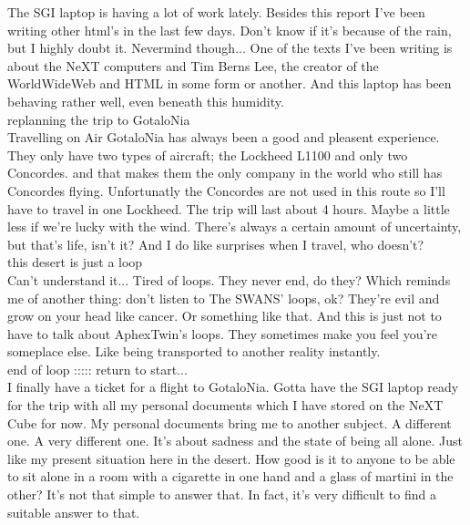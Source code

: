 \documentclass[11pt,twoside,a4paper]{book}
\begin{document}
\begin{multicols*}{2}
The SGI laptop is having a lot of work lately. Besides this report I've been writing other html's in the last few days. Don't know if it's because of the rain, but I highly doubt it. Nevermind though... One of the texts I've been writing is about the NeXT computers and Tim Berns Lee, the creator of the WorldWideWeb and HTML in some form or another. And this laptop has been behaving rather well, even beneath this humidity. ~\\ 

replanning the trip to GotaloNia ~\\

Travelling on Air GotaloNia has always been a good and pleasent experience. They only have two types of aircraft; the Lockheed L1100 and only two Concordes. and that makes them the only company in the world who still has Concordes flying. Unfortunatly the Concordes are not used in this route so I'll have to travel in one Lockheed. The trip will last about 4 hours. Maybe a little less if we're lucky with the wind. There's always a certain amount of uncertainty, but that's life, isn't it? And I do like surprises when I travel, who doesn't? ~\\

{\large this desert is just a loop} ~\\

Can't understand it... Tired of loops. They never end, do they? Which reminds me of another thing: don't listen to The SWANS' loops, ok? They're evil and grow on your head like cancer. Or something like that. And this is just not to have to talk about AphexTwin's loops. They sometimes make you feel you're someplace else. Like being transported to another reality instantly. ~\\

end of loop ::::: return to start... ~\\

I finally have a ticket for a flight to GotaloNia. Gotta have the SGI laptop ready for the trip with all my personal documents which I have stored on the NeXT Cube for now. My personal documents bring me to another subject. A different one. A very different one. It's about sadness and the state of being all alone. Just like my present situation here in the desert. How good is it to anyone to be able to sit alone in a room with a cigarette in one hand and a glass of martini in the other? It's not that simple to answer that. In fact, it's very difficult to find a suitable answer to that. ~\\


\end{multicols*}
\end{document}
